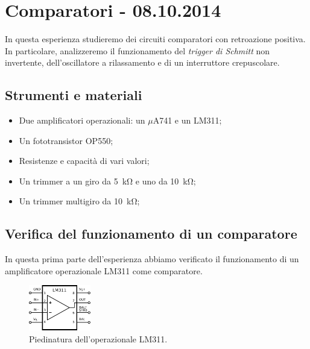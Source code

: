 \section{Comparatori - 08.10.2014}

In questa esperienza studieremo dei circuiti comparatori con retroazione positiva. In particolare, analizzeremo il funzionamento del \textit{trigger di Schmitt} non invertente, dell'oscillatore a rilassamento e di un interruttore crepuscolare.

\subsection*{Strumenti e materiali}

\begin{itemize} [noitemsep]
\item Due amplificatori operazionali: un $\mu$A741 e un LM311;
\item Un fototransistor OP550;
\item Resistenze e capacità di vari valori;
\item Un trimmer a un giro da \SI{5}{\kilo\ohm} e uno da \SI{10}{\kilo\ohm};
\item Un trimmer multigiro da \SI{10}{\kilo\ohm};
\end{itemize}

\subsection{Verifica del funzionamento di un comparatore}

In questa prima parte dell'esperienza abbiamo verificato il funzionamento di un amplificatore operazionale LM311 come comparatore.

\begin{figure}
  \begin{center}
    \includegraphics[width=0.240\textwidth]{../E04/latex/LM311.pdf}
  \end{center}
  \caption{Piedinatura dell'operazionale LM311.}
  \label{cir4:piedinatura_LM311}
\end{figure}

